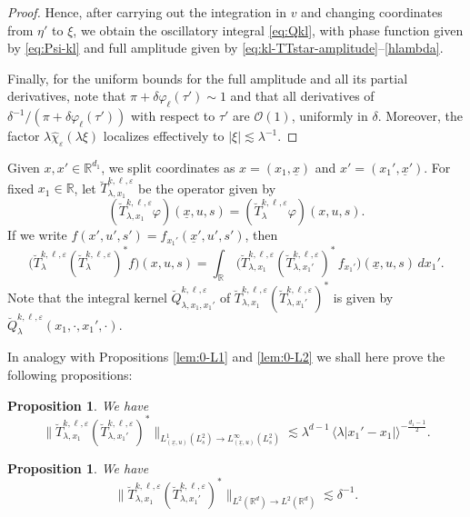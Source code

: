 \documentclass[leqno]{amsart}
\newtheorem{proposition}[theorem]{Proposition}
\theoremstyle{definition}
\theoremstyle{remark}
\numberwithin{equation}{section}
\newcommand{\R}{\mathbb{R}}
\renewcommand{\hat}{\widehat}
\begin{document}
\begin{proof}
Hence, after carrying out the integration in $v$ and changing coordinates from $\eta'$ to $\xi$, we obtain the oscillatory integral \eqref{eq:Qkl}, with phase function given by \eqref{eq:Psi-kl} and full amplitude given by \eqref{eq:kl-TTstar-amplitude}--\eqref{hlambda}.

Finally, for the uniform bounds for the full amplitude and all its partial derivatives, note that $\pi+\delta\varphi_\ell(\tau')\sim 1$ and that all derivatives of $\delta^{-1}/(\pi+\delta\varphi_\ell(\tau'))$ with respect to $\tau'$ are $\mathcal O(1)$, uniformly in $\delta$. Moreover, the factor $\lambda\hat\chi_\varepsilon(\lambda\xi)$ localizes effectively to $|\xi|\lesssim\lambda^{-1}$.
\end{proof}

Given $x,x'\in \R^{d_1}$, we split coordinates as $x = (x_1,\underline x)$ and $x' = (x_1',\underline x')$. For fixed $x_1\in \R$, let $\breve T_{\lambda,x_1}^{k,\ell,\varepsilon}$ be the operator given by
\[
(\breve T_{\lambda,x_1}^{k,\ell,\varepsilon} \varphi)(\underline x,u,s) = (\breve T^{k,\ell,\varepsilon}_\lambda \varphi)(x,u,s).
\]
If we write $f(x',u',s') = f_{x_1'}(\underline x',u',s')$, then
\[
\big(\breve T_\lambda^{k,\ell,\varepsilon} (\breve T_\lambda^{k,\ell,\varepsilon})^* f\big)(x, u,s) = \int_\R \, \big( \breve T_{\lambda,x_1}^{k,\ell,\varepsilon} (\breve T_{\lambda,x_1'}^{k,\ell,\varepsilon} )^* \, f_{x_1'}\big) (\underline x,u,s) \, dx_1'.
\]
Note that the integral kernel $\breve Q_{\lambda,x_1,x_1'}^{k,\ell,\varepsilon}$ of $\breve T_{\lambda,x_1}^{k,\ell,\varepsilon} (\breve T_{\lambda,x_1'}^{k,\ell,\varepsilon} )^*$ is given by $\breve Q_\lambda^{k,\ell,\varepsilon}(x_1,\cdot,x_1',\cdot)$.
\smallskip

In analogy with Propositions \ref{lem:0-L1} and \ref{lem:0-L2} we shall here prove the following propositions:
\begin{proposition}\label{lem:kl-L1}
We have
\[
\|\breve T_{\lambda,x_1}^{k,\ell,\varepsilon} (\breve T_{\lambda,x_1'}^{k,\ell,\varepsilon} )^* \|_{L_{(\underline x,u)}^{1}(L^2_s)\to L_{(\underline x,u)}^\infty(L^2_s)}
\lesssim \lambda^{d-1} \, \langle\lambda\left|x_1'-x_1\right|\rangle^{-\frac{d_1-1}{2}} .
\]
\end{proposition}

\begin{proposition}\label{lem:kl-L2}
We have
\[
\|\breve T_{\lambda,x_1}^{k,\ell,\varepsilon} (\breve T_{\lambda,x_1'}^{k,\ell,\varepsilon} )^*\|_{L^2(\R^{d})\to L^2(\R^{d})} \lesssim \delta^{-1}.
\]
\end{proposition}
\end{document}

